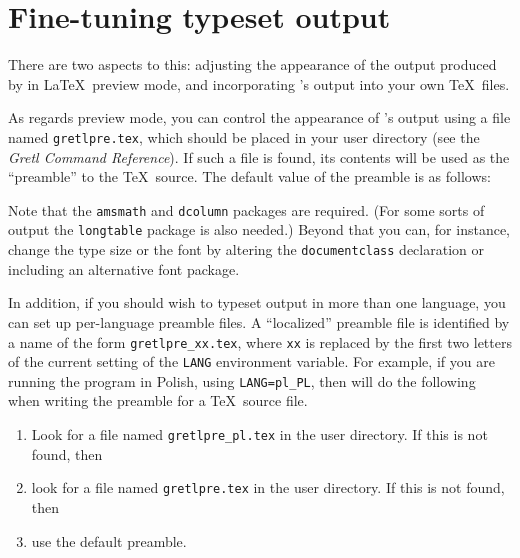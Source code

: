 \section{Fine-tuning typeset output}
\label{tex-tune}

There are two aspects to this: adjusting the appearance of the output
produced by  in \LaTeX\ preview mode, and incorporating
's output into your own \TeX\ files.

As regards preview mode, you can control the appearance of
's output using a file named \verb+gretlpre.tex+, which
should be placed in your  user directory (see the
\emph{Gretl Command Reference}).  If such a file is found, its
contents will be used as the ``preamble'' to the \TeX\ source.  The
default value of the preamble is as follows:
    

Note that the \verb+amsmath+ and \verb+dcolumn+ packages are required.
(For some sorts of output the \verb+longtable+ package is also
needed.)  Beyond that you can, for instance, change the type size or
the font by altering the \texttt{documentclass} declaration or
including an alternative font package.

In addition, if you should wish to typeset  output in more
than one language, you can set up per-language preamble files.  A
``localized'' preamble file is identified by a name of the form
\verb|gretlpre_xx.tex|, where \texttt{xx} is replaced by the first two
letters of the current setting of the \texttt{LANG} environment
variable.  For example, if you are running the program in Polish,
using \verb|LANG=pl_PL|, then  will do the following when
writing the preamble for a \TeX\ source file.

\begin{enumerate}
\item Look for a file named \verb|gretlpre_pl.tex| in the 
  user directory.  If this is not found, then
\item look for a file named \verb|gretlpre.tex| in the 
  user directory.  If this is not found, then
\item use the default preamble.
\end{enumerate}

